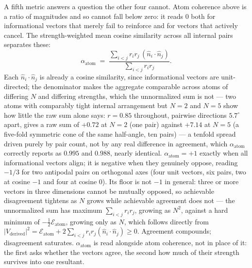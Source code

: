 \documentclass[12pt, a4paper]{article}
\begin{document}
A fifth metric answers a question the other four cannot. Atom
coherence above is a ratio of magnitudes and so cannot fall below
zero: it reads $0$ both for informational vectors that merely fail
to reinforce and for vectors that actively cancel. The
strength-weighted mean cosine similarity across all internal pairs
separates these:
\begin{equation}
    \alpha_{\text{atom}} \;=\;
    \frac{\sum_{i<j} r_i r_j\,(\hat n_i\cdot\hat n_j)}
         {\sum_{i<j} r_i r_j}.
    \label{eq:internal_alignment}
\end{equation}
Each $\hat n_i\cdot\hat n_j$ is already a cosine similarity, since
informational vectors are unit-directed; the denominator makes the
aggregate comparable across atoms of differing $N$ and differing
strengths, which the unnormalized sum is not --- two atoms with
comparably tight internal arrangement but $N=2$ and $N=5$ show how
little the raw sum alone says: $r=0.85$ throughout, pairwise
directions $5.7^\circ$ apart, gives a raw sum of $+0.72$ at $N=2$
(one pair) against $+7.14$ at $N=5$ (a five-fold symmetric cone of
the same half-angle, ten pairs) --- a tenfold spread driven purely by
pair count, not by any real difference in agreement, which
$\alpha_{\text{atom}}$ correctly reports as $0.995$ and $0.988$,
nearly identical. $\alpha_{\text{atom}}=+1$ exactly when all
informational vectors align; it is negative when they genuinely
oppose, reading $-1/3$ for two antipodal pairs on orthogonal axes
(four unit vectors, six pairs, two at cosine $-1$ and four at
cosine $0$). Its floor is not $-1$ in general: three
or more vectors in three dimensions cannot be mutually opposed, so
achievable disagreement tightens as $N$ grows while achievable
agreement does not --- the unnormalized sum has maximum
$\sum_{i<j}r_ir_j$, growing as $N^2$, against a hard minimum of
$-\tfrac{1}{2}\mathcal{E}_{\text{atom}}$, growing only as $N$, which
follows directly from $\lvert V_{\text{derived}}\rvert^2 =
\mathcal{E}_{\text{atom}} + 2\sum_{i<j} r_ir_j(\hat n_i\cdot\hat n_j)
\ge 0$. Agreement compounds; disagreement saturates.
$\alpha_{\text{atom}}$ is read alongside atom coherence, not in place
of it: the first asks whether the vectors agree, the second how much
of their strength survives into one resultant.
\end{document}
